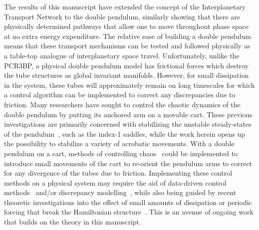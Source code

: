 \documentclass[11pt]{article}
\numberwithin{equation}{section}
\theoremstyle{plain}
\begin{document}
The results of this manuscript have extended the concept of the Interplanetary Transport Network to the double pendulum, similarly showing that there are physically determined pathways that allow one to move throughout phase space at no extra energy expenditure. The relative ease of building a double pendulum means that these transport mechanisms can be tested and followed physically as a table-top analogue of interplanetary space travel. Unfortunately, unlike the PCR3BP, a physical double pendulum model has frictional forces which destroy the tube structures as global invariant manifolds. However, for small dissipation in the system, these tubes will approximately remain on long timescales for which a control algorithm can be implemented to correct any discrepancies due to friction. Many researchers have sought to control the chaotic dynamics of the double pendulum by putting its anchored arm on a movable cart. These previous investigations are primarily concerned with stabilizing the unstable steady-states of the pendulum~\cite{driver2004design,zhong2001energy,ControlPend,hesse2018reinforcement}, such as the index-1 saddles, while the work herein opens up the possibility to stabilize a variety of acrobatic movements. With a double pendulum on a cart, methods of controlling chaos~\cite{OGY,ControlChaos1,ControlChaos2} could be implemented to introduce small movements of the cart to re-orient the pendulum arms to correct for any divergence of the tubes due to friction. Implementing these control methods on a physical system may require the aid of data-driven control methods~\cite{BramUPO} and/or discrepancy modelling~\cite{kaheman2019learning}, while also being guided by recent theoretic investigations into the effect of small amounts of dissipation or periodic forcing that break the Hamiltonian structure~\cite{DissRoss,ZhongGeometry,PerForced}. This is an avenue of ongoing work that builds on the theory in this manuscript.      
\end{document}
